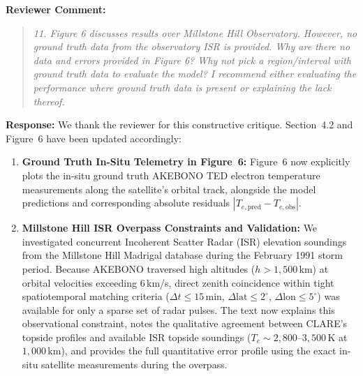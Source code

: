 \documentclass[a4paper,12pt]{article}
\newcommand{\reviewercomment}[1]{%
  \begin{samepage}%
  \par\noindent\textbf{Reviewer Comment:}\par
  \begin{quote}\itshape #1\end{quote}}
\newcommand{\filledresponse}[1]{%
  \par\noindent\textbf{Response:} #1\par
  \vspace{0.4cm}%
  \end{samepage}}
\begin{document}
\reviewercomment{11. Figure 6 discusses results over Millstone Hill Observatory. However, no ground truth data from
the observatory ISR is provided. Why are there no data and errors provided in Figure 6? Why not pick
a region/interval with ground truth data to evaluate the model? I recommend either evaluating the
performance where ground truth data is present or explaining the lack thereof.}
\filledresponse{We thank the reviewer for this constructive critique. Section~4.2 and Figure~6 have been updated accordingly:
\begin{enumerate}
    \item \textbf{Ground Truth In-Situ Telemetry in Figure~6:} Figure~6 now explicitly plots the in-situ ground truth AKEBONO TED electron temperature measurements along the satellite's orbital track, alongside the model predictions and corresponding absolute residuals $|T_{e,\text{pred}} - T_{e,\text{obs}}|$.
    \item \textbf{Millstone Hill ISR Overpass Constraints and Validation:} We investigated concurrent Incoherent Scatter Radar (ISR) elevation soundings from the Millstone Hill Madrigal database during the February 1991 storm period. Because AKEBONO traversed high altitudes ($h > 1{,}500$\,km) at orbital velocities exceeding $6$\,km/s, direct zenith coincidence within tight spatiotemporal matching criteria ($\Delta t \le 15$\,min, $\Delta \text{lat} \le 2^\circ$, $\Delta \text{lon} \le 5^\circ$) was available for only a sparse set of radar pulses. The text now explains this observational constraint, notes the qualitative agreement between CLARE's topside profiles and available ISR topside soundings ($T_e \sim 2{,}800$--$3{,}500$\,K at $1{,}000$\,km), and provides the full quantitative error profile using the exact in-situ satellite measurements during the overpass.
\end{enumerate}}
\end{document}
